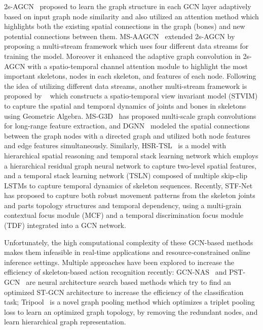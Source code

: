 \documentclass[journal]{IEEEtran}
\theoremstyle{definition}
\begin{document}
2s-AGCN~\cite{shi2019two} proposed to learn the graph structure in each GCN layer adaptively based on input graph node similarity and also utilized an attention method which highlights both the existing spatial connections in the graph (bones) and new potential connections between them. 
MS-AAGCN~\cite{shi2020multistream} extended 2s-AGCN by proposing a multi-stream framework which uses four different data streams for training the model. Moreover it enhanced the adaptive graph convolution in 2s-AGCN with a spatio-temporal channel attention module to highlight the most important skeletons, nodes in each skeleton, and features of each node. Following the idea of utilizing different data streams, another multi-stream framework is proposed by ~\cite{li2020learning} which constructs a spatio-temporal view invariant model (STVIM) to capture the spatial and temporal dynamics of joints and bones in skeletons using Geometric Algebra. 
MS-G3D~\cite{liu2020disentangling} has proposed multi-scale graph convolutions for long-range feature extraction, and DGNN~\cite{shi2019skeleton_directed} modeled the spatial connections between the graph nodes with a directed graph and utilized both node features and edge features simultaneously. Similarly, HSR-TSL~\cite{si2020skeleton} is a model with hierarchical spatial reasoning and temporal stack learning network which employs a hierarchical residual graph neural network to capture two-level spatial features, and a temporal stack learning network (TSLN) composed of multiple skip-clip LSTMs to capture temporal dynamics of skeleton sequences. 
Recently, STF-Net~\cite{wu2023spatiotemporal} has proposed to capture both robust movement patterns from the skeleton joints and parts topology structures and temporal dependency, using a multi-grain contextual focus module (MCF) and a temporal discrimination focus module (TDF) integrated into a GCN network. 

Unfortunately, the high computational complexity of these GCN-based methods makes them infeasible in real-time applications and resource-constrained online inference settings.
Multiple approaches have been explored to increase the efficiency of skeleton-based action recognition recently:
GCN-NAS~\cite{peng2020learning} and PST-GCN~\cite{heidari2021progressive} are neural architecture search based methods which try to find an optimized ST-GCN architecture to increase the efficiency of the classification task; 
Tripool~\cite{peng2021tripool} is a novel graph pooling method which optimizes a triplet pooling loss to learn an optimized graph topology, by removing the redundant nodes, and learn hierarchical graph representation. 
\end{document}
